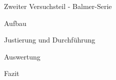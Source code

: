 \documentclass[pdftex, a4paper,11pt, twoside, ngerman]{report}
\begin{document}
 
 
  \begin{chapter}{Zweiter Versuchsteil - Balmer-Serie}
    \label{chp:Balmer}
 
 
    \begin{section}{Aufbau}
      \label{chp:Balmer:sec:Aufbau}
      
      
      
    \end{section}
   
   
   
    \begin{section}{Justierung und Durchführung}
      \label{chp:Balmer:sec:JusitierungDurchfuehrung}
     
     
    
    \end{section}


    

    \begin{section}{Auswertung}
      \label{chp:Balmer:sec:Auswertung}
      
      
     
    \end{section}
   
   
   
    \begin{section}{Fazit}
      \label{chp:Balmer:sec:Fazit}
      
      
      
    \end{section}
   
  \end{chapter}
  
  
  
  
  
  
  
  \begin{thebibliography}{99}
    \scriptsize
    
  \end{thebibliography}
 
\end{document}
